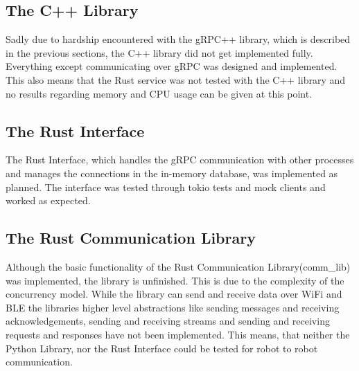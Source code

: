 \subsection{The C++ Library}
Sadly due to hardship encountered with the gRPC++ library, which is described in the previous sections, the C++ library did not get implemented fully. Everything except communicating over gRPC was designed and implemented.
This also means that the Rust service was not tested with the C++ library and no results regarding memory and CPU usage can be given at this point.

\subsection{The Rust Interface}
The Rust Interface, which handles the gRPC communication with other processes and manages the connections in the in-memory database, was implemented as planned. The interface was tested through tokio tests and mock clients and worked as expected.

\subsection{The Rust Communication Library}
Although the basic functionality of the Rust Communication Library(comm\_lib) was implemented, the library is unfinished. This is due to the complexity of the concurrency model. While the library can send and receive data over WiFi and
BLE the libraries higher level abstractions like sending messages and receiving acknowledgements, sending and receiving streams and sending and receiving requests and responses have not been implemented. This means, that neither the
Python Library, nor the Rust Interface could be tested for robot to robot communication.

